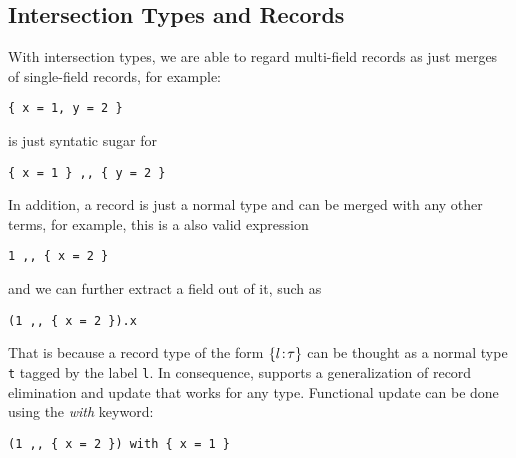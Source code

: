 {\subsection{Intersection Types and Records}


With intersection types, we are able to regard multi-field records as just
merges of single-field records, for example:
\begin{lstlisting}
{ x = 1, y = 2 }
\end{lstlisting}
is just syntatic sugar for
\begin{lstlisting}
{ x = 1 } ,, { y = 2 }
\end{lstlisting}
In addition, a record is just a normal type and can be merged with any other
terms, for example, this is a also valid expression
\begin{lstlisting}
1 ,, { x = 2 }
\end{lstlisting}
and we can further extract a field out of it, such as
\begin{lstlisting}
(1 ,, { x = 2 }).x
\end{lstlisting}
That is because a record type of the form $ \{ l \!:\! \tau \} $ can be thought as a
normal type \lstinline{t} tagged by the label \lstinline{l}. In consequence,
\name supports a generalization of record elimination and update that works for
any type. Functional update can be done using the \emph{with} keyword:
\begin{lstlisting}
(1 ,, { x = 2 }) with { x = 1 }
\end{lstlisting}



}
